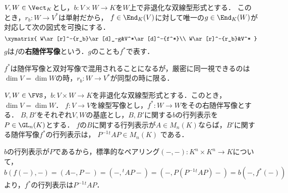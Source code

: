 \documentclass[uplatex, dvipdfmx]{jsreport}
\begin{document}
\begin{definition}
    $V,W\in\Vect_K$とし，$b:V\times W\to K$を$W$上で非退化な双線型形式とする．
    このとき，$r_b:W\to V^*$は単射だから，
    $f\in\End_K(V)$に対して唯一の$g\in\End_K(W)$が対応して次の図式を可換にする．
    \[\xymatrix{
            W\ar[r]^-{r_b}\ar[d]_-g&V^*\ar[d]^-{f^*}\\
            W\ar[r]^-{r_b}&V^*
        }\]
    $g$は$f$の\textbf{右随伴写像}という．$g$のことも$f^*$で表す．
\end{definition}
\begin{remark}[記号の混用]
    $f^*$は随伴写像と双対写像で混用されることになるが，厳密に同一視できるのは$\dim V=\dim W$の時，$r_b:W\to V^*$が同型の時に限る．
\end{remark}



\begin{proposition}[随伴写像の行列表示]
    $V,W\in\FVS$，$b:V\times W\to K$を非退化な双線型形式とする．このとき，$\dim V=\dim W$．
    $f:V\to V$を線型写像とし，$f^*:W\to W$をその右随伴写像とする．
    $B,B'$をそれぞれ$V,W$の基底とし，$B,B'$に関する$b$の行列表示を$P\in\GL_n(K)$とする．
    $f$の$B$に関する行列表示が$A\in M_n(K)$ならば，$B'$に関する随伴写像$f^*$の行列表示は，
    $P^{-1}{}^t\!AP\in M_n(K)$
    である．
\end{proposition}
\begin{Proof}
    $b$の行列表示が$P$であるから，標準的なペアリング$(-,-):K^n\times K^n\to K$について，
    \[b(f(-),-)=(A-,P-)=(-,{}^t\!AP-)=(-,P(P^{-1}{}^t\!AP)-)=b(-,f^*(-))\]
    より，$f^*$の行列表示は$P^{-1}{}^t\!AP$．
\end{Proof}
\end{document}
